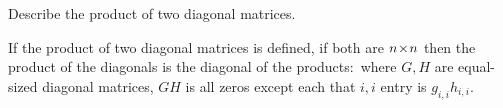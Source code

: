 
\begin{Exercise}[
name={},
title={}, 
difficulty=0,
origin={\cite{JH}}]
Describe the product of two diagonal matrices.
\end{Exercise}
\begin{Answer}
      If the product of two diagonal matrices is defined, if 
      both are $n \! \times \! n$ then 
      the product of the diagonals is the diagonal
      of the products:~where \( G,H \) are equal-sized diagonal matrices,
      \( GH \) is all zeros except each that \( i,i \) entry is
      \( g_{i,i}h_{i,i} \).
\end{Answer}
